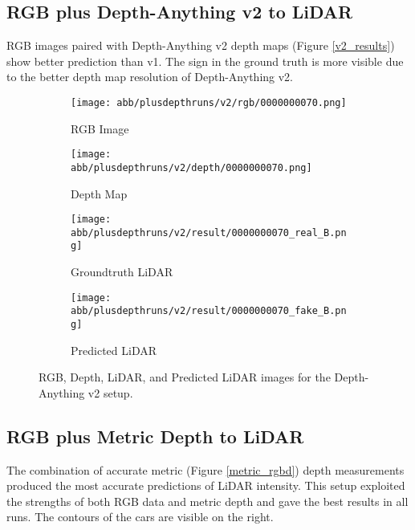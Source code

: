 \subsection{RGB plus Depth-Anything v2 to LiDAR}
RGB images paired with Depth-Anything v2 depth maps (Figure \ref{v2_results}) show better prediction than v1. The sign in the ground  truth is more visible due to the better depth map resolution of Depth-Anything v2.
\begin{figure}[!ht]
	\centering
	\begin{subfigure}{0.4\textwidth}
		\centering
		\texttt{[image: abb/plusdepthruns/v2/rgb/0000000070.png]}
		\caption{RGB Image}
		\label{fig:v2_rgb}
	\end{subfigure}
	
	\vspace{1em} %
	
	\begin{subfigure}{0.4\textwidth}
		\centering
		\texttt{[image: abb/plusdepthruns/v2/depth/0000000070.png]}
		\caption{Depth Map}
		\label{fig:v2_depth}
	\end{subfigure}
	
	\vspace{1em} %
	
	\begin{subfigure}{0.25\textwidth}
		\centering
		\texttt{[image: abb/plusdepthruns/v2/result/0000000070\_real\_B.png]}
		\caption{Groundtruth LiDAR}
		\label{fig:v2_pred_lidar}
	\end{subfigure}
	\begin{subfigure}{0.25\textwidth}
		\centering
		\texttt{[image: abb/plusdepthruns/v2/result/0000000070\_fake\_B.png]}
		\caption{Predicted LiDAR}
		\label{v2}
	\end{subfigure}
	
	\caption{RGB, Depth, LiDAR, and Predicted LiDAR images for the Depth-Anything v2 setup.}
	\label{v2_rgbd}
\end{figure}
\subsection{RGB plus Metric Depth to LiDAR}

The combination of accurate metric (Figure \ref{metric_rgbd}) depth measurements produced the most accurate predictions of LiDAR intensity. This setup exploited the strengths of both RGB data and metric depth and gave the best results in all runs. The contours of the cars are visible on the right. 

